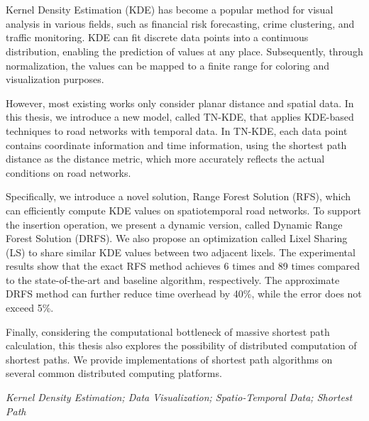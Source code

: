 \newpage
\vspace{-1cm}
\chapter*{\xiaosan {}}
\vspace{-0.5cm}

Kernel Density Estimation (KDE) has become a popular method for visual analysis in various fields, such as financial risk forecasting, crime clustering, and traffic monitoring.
KDE can fit discrete data points into a continuous distribution, enabling the prediction of values at any place. Subsequently, through normalization, the values can be mapped to a finite range for coloring and visualization purposes.

However, most existing works only consider planar distance and spatial data. In this thesis, we introduce a new model, called TN-KDE, that applies KDE-based techniques to road networks with temporal data. In TN-KDE, each data point contains coordinate information and time information, using the shortest path distance as the distance metric, which more accurately reflects the actual conditions on road networks.

Specifically, we introduce a novel solution, Range Forest Solution (RFS), which can efficiently compute KDE values on spatiotemporal road networks. To support the insertion operation, we present a dynamic version, called Dynamic Range Forest Solution (DRFS). We also propose an optimization called Lixel Sharing (LS) to share similar KDE values between two adjacent lixels. The experimental results show that the exact RFS method achieves 6 times and 89 times compared to the state-of-the-art and baseline algorithm, respectively. The approximate DRFS method can further reduce time overhead by 40\%, while the error does not exceed 5\%.

Finally, considering the computational bottleneck of massive shortest path calculation, this thesis also explores the possibility of distributed computation of shortest paths. We provide implementations of shortest path algorithms on several common distributed computing platforms.

\hspace{-0.5cm}
{}
\textit{Kernel Density Estimation; Data Visualization; Spatio-Temporal Data; Shortest Path}